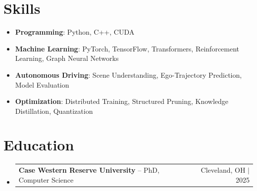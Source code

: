 \documentclass[letterpaper,13pt]{article}
\makeatletter
\newcommand{\resumeProjectHeading}[2]{
    \item
    \begin{tabular*}{\textwidth}{l@{\extracolsep{\fill}}r}
      \small#1 & #2 \\
    \end{tabular*}\vspace{-4pt}
}
\newcommand{\resumeSubHeadingListStart}{\begin{itemize}[leftmargin=0in, label={}]}
\newcommand{\resumeSubHeadingListEnd}{\end{itemize}}
\makeatother
\begin{document}
\section{Skills}
\vspace{0.02cm}
\begin{itemize}[leftmargin=0.15in, label={}, itemsep=2pt, topsep=1pt]
  \item \textbf{Programming}: Python, C++, CUDA
  \item \textbf{Machine Learning}: PyTorch, TensorFlow, Transformers, Reinforcement Learning, Graph Neural Networks
  \item \textbf{Autonomous Driving}: Scene Understanding, Ego-Trajectory Prediction, Model Evaluation
  \item \textbf{Optimization}: Distributed Training, Structured Pruning, Knowledge Distillation, Quantization
\end{itemize}
\vspace{0.02cm}

\section{Education}
\resumeSubHeadingListStart
  \resumeProjectHeading{\textbf{Case Western Reserve University} -- PhD, Computer Science}{Cleveland, OH $|$ 2025}
\resumeSubHeadingListEnd
\end{document}
